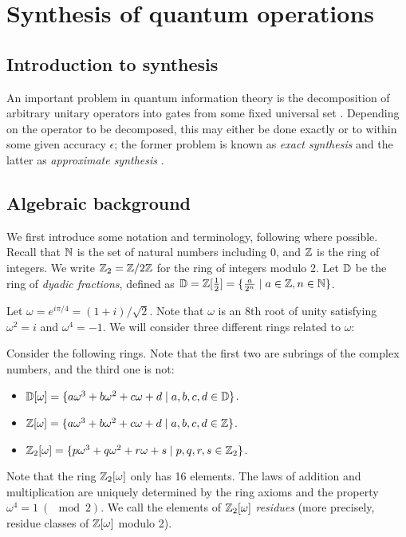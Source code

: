 \chapter{Synthesis of quantum operations} %
\label{cha:synthesis_of_quantum_operations}

\section{Introduction to synthesis} %
\label{sec:introduction_to_synthesis}
An important problem in quantum information theory is the decomposition of arbitrary unitary
operators into gates from some fixed universal set {\cite{neilsen2000:QuantumComputationAndInfo}}.
Depending on the operator to be decomposed, this may either be done exactly or to within some given
accuracy $\epsilon$; the former problem is known as {\em exact synthesis} and the latter as {\em
approximate synthesis} {\cite{Kliuchnikov-et-al}}.

\section{Algebraic background} %
\label{sec:algebraic_background}

We first introduce some notation and terminology, following {\cite{Kliuchnikov-et-al}} where
possible. Recall that $\mathbb{N}$ is the set of natural numbers including 0, and $\mathbb{Z}$ is the ring of
\linebreak integers. We write $\mathbb{Z}_2=\mathbb{Z}/2\mathbb{Z}$ for the ring of integers modulo 2. Let $\mathbb{D}$ be the ring
of {\em dyadic fractions}, defined as $\mathbb{D} = \mathbb{Z}[\frac12] = \{\frac{a}{2^n}\mid a\in\mathbb{Z}, n\in\mathbb{N}\}$.

Let $\omega = e^{i\pi/4} = (1+i)/\sqrt{2}$. Note that $\omega$ is an 8th root of unity satisfying
$\omega^2=i$ and $\omega^4=-1$. We will consider three different rings related to $\omega$:

\begin{definition}
  Consider the following rings. Note that the first two are subrings of the complex numbers, and
  the third one is not:
  \begin{itemize}
    \item $\mathbb{D}[\omega] = \{a\omega^3+b\omega^2+c\omega+d \mid a,b,c,d\in\mathbb{D}\}$.
    \item $\mathbb{Z}[\omega] = \{a\omega^3+b\omega^2+c\omega+d \mid a,b,c,d\in\mathbb{Z}\}$.
    \item $\mathbb{Z}_2[\omega] = \{p\omega^3+q\omega^2+r\omega+s \mid p,q,r,s\in\mathbb{Z}_2\}$.
  \end{itemize}
  Note that the ring $\mathbb{Z}_2[\omega]$ only has 16 elements. The laws of addition and multiplication are
  uniquely determined by the ring axioms and the property $\omega^4=1\ (\mod 2)$. We call the
  elements of $\mathbb{Z}_2[\omega]$ {\em residues} (more precisely, residue classes of $\mathbb{Z}[\omega]$ modulo 2).
\end{definition}

